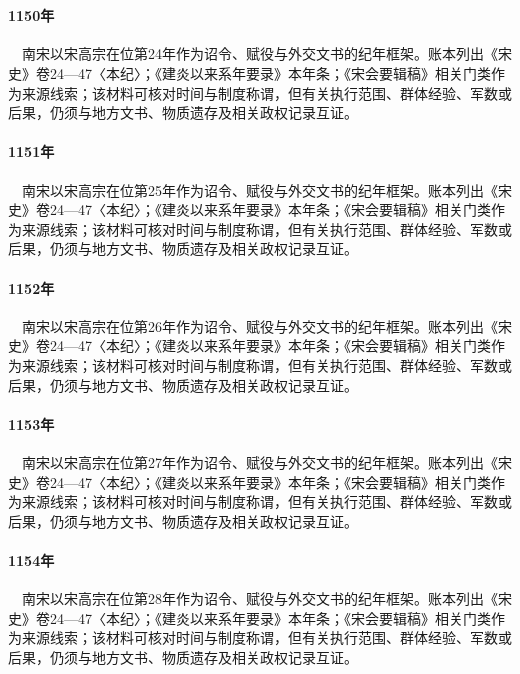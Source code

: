 \section{}

\paragraph{1150年}　南宋以宋高宗在位第24年作为诏令、赋役与外交文书的纪年框架。账本列出《宋史》卷24—47〈本纪〉；《建炎以来系年要录》本年条；《宋会要辑稿》相关门类作为来源线索；该材料可核对时间与制度称谓，但有关执行范围、群体经验、军数或后果，仍须与地方文书、物质遗存及相关政权记录互证。

\paragraph{1151年}　南宋以宋高宗在位第25年作为诏令、赋役与外交文书的纪年框架。账本列出《宋史》卷24—47〈本纪〉；《建炎以来系年要录》本年条；《宋会要辑稿》相关门类作为来源线索；该材料可核对时间与制度称谓，但有关执行范围、群体经验、军数或后果，仍须与地方文书、物质遗存及相关政权记录互证。

\paragraph{1152年}　南宋以宋高宗在位第26年作为诏令、赋役与外交文书的纪年框架。账本列出《宋史》卷24—47〈本纪〉；《建炎以来系年要录》本年条；《宋会要辑稿》相关门类作为来源线索；该材料可核对时间与制度称谓，但有关执行范围、群体经验、军数或后果，仍须与地方文书、物质遗存及相关政权记录互证。

\paragraph{1153年}　南宋以宋高宗在位第27年作为诏令、赋役与外交文书的纪年框架。账本列出《宋史》卷24—47〈本纪〉；《建炎以来系年要录》本年条；《宋会要辑稿》相关门类作为来源线索；该材料可核对时间与制度称谓，但有关执行范围、群体经验、军数或后果，仍须与地方文书、物质遗存及相关政权记录互证。

\paragraph{1154年}　南宋以宋高宗在位第28年作为诏令、赋役与外交文书的纪年框架。账本列出《宋史》卷24—47〈本纪〉；《建炎以来系年要录》本年条；《宋会要辑稿》相关门类作为来源线索；该材料可核对时间与制度称谓，但有关执行范围、群体经验、军数或后果，仍须与地方文书、物质遗存及相关政权记录互证。

